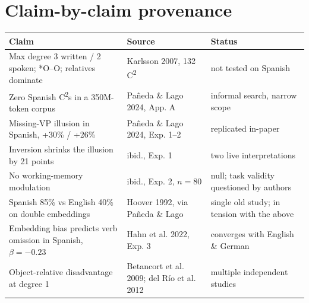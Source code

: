 \documentclass[11pt, a4paper]{article}
\begin{document}
\section*{Claim-by-claim provenance}

\begin{center}
\small
\begin{longtable}{@{}p{6.3cm}p{4cm}p{3.5cm}@{}}
\toprule
\textbf{Claim} & \textbf{Source} & \textbf{Status} \\
\midrule
\endhead
Max degree 3 written / 2 spoken; *O--O; relatives dominate & \ttfamily\footnotesize Karlsson 2007, 132 C\textsuperscript{2} & \color{caution}\ttfamily\footnotesize not tested on Spanish \\[4pt]
Zero Spanish C\textsuperscript{2}s in a 350M-token corpus & \ttfamily\footnotesize Pañeda \& Lago 2024, App. A & \color{caution}\ttfamily\footnotesize informal search, narrow scope \\[4pt]
Missing-VP illusion in Spanish, +30\% / +26\% & \ttfamily\footnotesize Pañeda \& Lago 2024, Exp. 1--2 & \color{good}\ttfamily\footnotesize replicated in-paper \\[4pt]
Inversion shrinks the illusion by 21 points & \ttfamily\footnotesize ibid., Exp. 1 & \color{caution}\ttfamily\footnotesize two live interpretations \\[4pt]
No working-memory modulation & \ttfamily\footnotesize ibid., Exp. 2, $n=80$ & \color{caution}\ttfamily\footnotesize null; task validity questioned by authors \\[4pt]
Spanish 85\% vs English 40\% on double embeddings & \ttfamily\footnotesize Hoover 1992, via Pañeda \& Lago & \color{bad}\ttfamily\footnotesize single old study; in tension with the above \\[4pt]
Embedding bias predicts verb omission in Spanish, $\beta=-0.23$ & \ttfamily\footnotesize Hahn et al. 2022, Exp. 3 & \color{good}\ttfamily\footnotesize converges with English \& German \\[4pt]
Object-relative disadvantage at degree 1 & \ttfamily\footnotesize Betancort et al. 2009; del Río et al. 2012 & \color{good}\ttfamily\footnotesize multiple independent studies \\
\bottomrule
\end{longtable}
\end{center}
\end{document}
